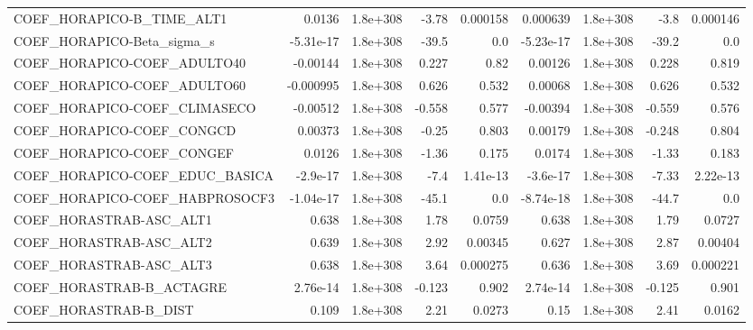 \begin{tabular}{lrrrrrrrr}
COEF\_HORAPICO-B\_TIME\_ALT1         &      0.0136 &     1.8e+308 &     -3.78 & 0.000158 &   0.000639 &    1.8e+308 &         -3.8 &      0.000146 \\
COEF\_HORAPICO-Beta\_sigma\_s        &   -5.31e-17 &     1.8e+308 &     -39.5 &      0.0 &  -5.23e-17 &    1.8e+308 &        -39.2 &           0.0 \\
COEF\_HORAPICO-COEF\_ADULTO40       &    -0.00144 &     1.8e+308 &     0.227 &     0.82 &    0.00126 &    1.8e+308 &        0.228 &         0.819 \\
COEF\_HORAPICO-COEF\_ADULTO60       &   -0.000995 &     1.8e+308 &     0.626 &    0.532 &    0.00068 &    1.8e+308 &        0.626 &         0.532 \\
COEF\_HORAPICO-COEF\_CLIMASECO      &    -0.00512 &     1.8e+308 &    -0.558 &    0.577 &   -0.00394 &    1.8e+308 &       -0.559 &         0.576 \\
COEF\_HORAPICO-COEF\_CONGCD         &     0.00373 &     1.8e+308 &     -0.25 &    0.803 &    0.00179 &    1.8e+308 &       -0.248 &         0.804 \\
COEF\_HORAPICO-COEF\_CONGEF         &      0.0126 &     1.8e+308 &     -1.36 &    0.175 &     0.0174 &    1.8e+308 &        -1.33 &         0.183 \\
COEF\_HORAPICO-COEF\_EDUC\_BASICA    &    -2.9e-17 &     1.8e+308 &      -7.4 & 1.41e-13 &   -3.6e-17 &    1.8e+308 &        -7.33 &      2.22e-13 \\
COEF\_HORAPICO-COEF\_HABPROSOCF3    &   -1.04e-17 &     1.8e+308 &     -45.1 &      0.0 &  -8.74e-18 &    1.8e+308 &        -44.7 &           0.0 \\
COEF\_HORASTRAB-ASC\_ALT1           &       0.638 &     1.8e+308 &      1.78 &   0.0759 &      0.638 &    1.8e+308 &         1.79 &        0.0727 \\
COEF\_HORASTRAB-ASC\_ALT2           &       0.639 &     1.8e+308 &      2.92 &  0.00345 &      0.627 &    1.8e+308 &         2.87 &       0.00404 \\
COEF\_HORASTRAB-ASC\_ALT3           &       0.638 &     1.8e+308 &      3.64 & 0.000275 &      0.636 &    1.8e+308 &         3.69 &      0.000221 \\
COEF\_HORASTRAB-B\_ACTAGRE          &    2.76e-14 &     1.8e+308 &    -0.123 &    0.902 &   2.74e-14 &    1.8e+308 &       -0.125 &         0.901 \\
COEF\_HORASTRAB-B\_DIST             &       0.109 &     1.8e+308 &      2.21 &   0.0273 &       0.15 &    1.8e+308 &         2.41 &        0.0162 \\

\end{tabular}
